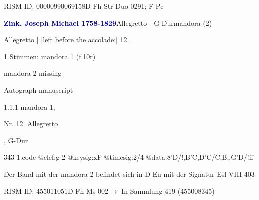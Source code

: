 \documentclass[twocolumn, 12pt]{book}
\begin{document}
\par RISM-ID: 00000990069158\newline D-Fh  Str Duo 0291; F-Pc
\par \vspace{16pt} \textcolor{darkblue}{\textbf{Zink, Joseph Michael  1758-1829}}\hfillplus{\textbf{[343]}}\newline Allegretto - G-Dur\newline mandora (2)
\par \begin{itshape}[f.10r, at left:] Allegretto | [left before the accolade:] 12.\end{itshape} 
\par \textcolor{darkblue}{}  1 Stimmen: mandora 1  (f.10r)\newline \begin{small} mandora 2 missing\end{small} \newline Autograph manuscript
\par 1.1.1  mandora 1, \begin{itshape}Nr. 12. Allegretto\end{itshape}, G-Dur  
\begin{filecontents*}{343-1.code}
@clef:g-2
@keysig:xF
@timesig:2/4
@data:8'D/!,B'C,D'C/C,B,,G'D/!ff
\end{filecontents*}
\newline %
\par Der Band mit der mandora 2 befindet sich in D Eu mit der Signatur Esl VIII 403
\par RISM-ID: 455011051\newline D-Fh  Ms 002\newline $\rightarrow$ In Sammlung 419 (455008345)
      
\end{document}
